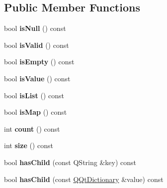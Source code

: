 \subsection*{Public Member Functions}
\begin{DoxyCompactItemize}
\item 
\mbox{\label{class_q_qt_dictionary_a31411f34db7fb15ebc753150ba513000}} 
bool {\bfseries is\+Null} () const
\item 
\mbox{\label{class_q_qt_dictionary_af6c0369d341e4df75ce6470fb75d9e3c}} 
bool {\bfseries is\+Valid} () const
\item 
\mbox{\label{class_q_qt_dictionary_aac41571f4af553f810149968281d8b5e}} 
bool {\bfseries is\+Empty} () const
\item 
\mbox{\label{class_q_qt_dictionary_a9b3d0b8592316a2019ca49f7ddb16082}} 
bool {\bfseries is\+Value} () const
\item 
\mbox{\label{class_q_qt_dictionary_a49b3c72462621bf0e9b4ffbb51002306}} 
bool {\bfseries is\+List} () const
\item 
\mbox{\label{class_q_qt_dictionary_a338ef75428b7812f00ac31d5891ba4c3}} 
bool {\bfseries is\+Map} () const
\item 
\mbox{\label{class_q_qt_dictionary_a74db42b92cc4f4b397c3fee6ff1e68d4}} 
int {\bfseries count} () const
\item 
\mbox{\label{class_q_qt_dictionary_a914c3673ee2312dd361dc379ed1bc554}} 
int {\bfseries size} () const
\item 
\mbox{\label{class_q_qt_dictionary_af81c573727fc296db7e331e9f2186530}} 
bool {\bfseries has\+Child} (const Q\+String \&key) const
\item 
\mbox{\label{class_q_qt_dictionary_a1dea0c52119550861498142b858c745e}} 
bool {\bfseries has\+Child} (const \mbox{\hyperlink{class_q_qt_dictionary}{Q\+Qt\+Dictionary}} \&value) const
\item 

\end{DoxyCompactItemize}
